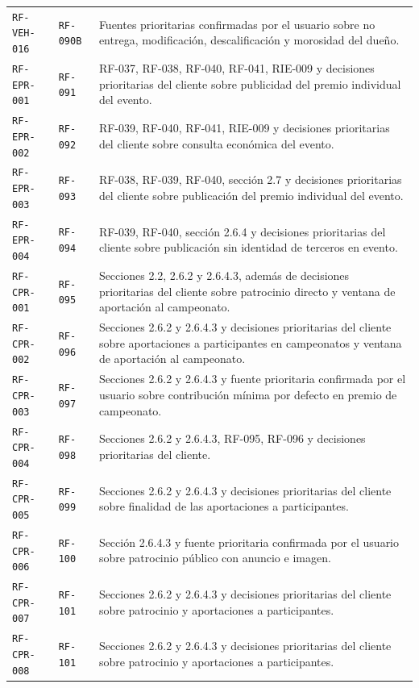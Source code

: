 \documentclass[10pt,letterpaper]{article}
\begin{document}
\begin{landscape}
\begin{longtable}{P{2.7cm}P{2.6cm}P{15.7cm}}
\texttt{RF-VEH-016} & \texttt{RF-090B} & Fuentes prioritarias confirmadas por el usuario sobre no entrega, modificación, descalificación y morosidad del dueño.\\
\texttt{RF-EPR-001} & \texttt{RF-091} & RF-037, RF-038, RF-040, RF-041, RIE-009 y decisiones prioritarias del cliente sobre publicidad del premio individual del evento.\\
\texttt{RF-EPR-002} & \texttt{RF-092} & RF-039, RF-040, RF-041, RIE-009 y decisiones prioritarias del cliente sobre consulta económica del evento.\\
\texttt{RF-EPR-003} & \texttt{RF-093} & RF-038, RF-039, RF-040, sección 2.7 y decisiones prioritarias del cliente sobre publicación del premio individual del evento.\\
\texttt{RF-EPR-004} & \texttt{RF-094} & RF-039, RF-040, sección 2.6.4 y decisiones prioritarias del cliente sobre publicación sin identidad de terceros en evento.\\
\texttt{RF-CPR-001} & \texttt{RF-095} & Secciones 2.2, 2.6.2 y 2.6.4.3, además de decisiones prioritarias del cliente sobre patrocinio directo y ventana de aportación al campeonato.\\
\texttt{RF-CPR-002} & \texttt{RF-096} & Secciones 2.6.2 y 2.6.4.3 y decisiones prioritarias del cliente sobre aportaciones a participantes en campeonatos y ventana de aportación al campeonato.\\
\texttt{RF-CPR-003} & \texttt{RF-097} & Secciones 2.6.2 y 2.6.4.3 y fuente prioritaria confirmada por el usuario sobre contribución mínima por defecto en premio de campeonato.\\
\texttt{RF-CPR-004} & \texttt{RF-098} & Secciones 2.6.2 y 2.6.4.3, RF-095, RF-096 y decisiones prioritarias del cliente.\\
\texttt{RF-CPR-005} & \texttt{RF-099} & Secciones 2.6.2 y 2.6.4.3 y decisiones prioritarias del cliente sobre finalidad de las aportaciones a participantes.\\
\texttt{RF-CPR-006} & \texttt{RF-100} & Sección 2.6.4.3 y fuente prioritaria confirmada por el usuario sobre patrocinio público con anuncio e imagen.\\
\texttt{RF-CPR-007} & \texttt{RF-101} & Secciones 2.6.2 y 2.6.4.3 y decisiones prioritarias del cliente sobre patrocinio y aportaciones a participantes.\\
\texttt{RF-CPR-008} & \texttt{RF-101} & Secciones 2.6.2 y 2.6.4.3 y decisiones prioritarias del cliente sobre patrocinio y aportaciones a participantes.\\

\end{longtable}
\end{landscape}
\end{document}
